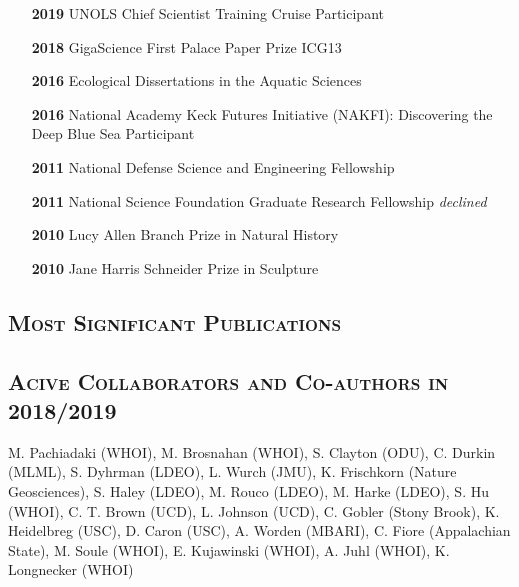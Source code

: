 \documentclass[svgnames,11pt]{article}
\begin{document}
\begin{itemize}[label={9999:},leftmargin=*,itemsep=0pt]
\item[\textbf{2019}] UNOLS Chief Scientist Training Cruise Participant
\item[\textbf{2018}] GigaScience First Palace Paper Prize ICG13
\item[\textbf{2016}] Ecological Dissertations in the Aquatic Sciences
\item[\textbf{2016}] National Academy Keck Futures Initiative (NAKFI): Discovering the Deep Blue Sea Participant
\item[\textbf{2011}] National Defense Science and Engineering Fellowship
\item[\textbf{2011}] National Science Foundation Graduate Research Fellowship \textit{declined}
\item[\textbf{2010}] Lucy Allen Branch Prize in Natural History
\item[\textbf{2010}] Jane Harris Schneider Prize in Sculpture
\end{itemize}

\subsection*{\textsc{Most Significant Publications}}
\vspace*{-0.75cm}

\subsection*{\textsc{Acive Collaborators and Co-authors in 2018/2019}}
M. Pachiadaki (WHOI), M. Brosnahan (WHOI), S. Clayton (ODU), C. Durkin (MLML), S. Dyhrman (LDEO), L. Wurch (JMU), K. Frischkorn (Nature Geosciences), S. Haley (LDEO), M. Rouco (LDEO), M. Harke (LDEO), S. Hu (WHOI), C. T. Brown (UCD), L. Johnson (UCD), C. Gobler (Stony Brook), K. Heidelbreg (USC), D. Caron (USC), A. Worden (MBARI), C. Fiore (Appalachian State), M. Soule (WHOI), E. Kujawinski (WHOI), A. Juhl (WHOI), K. Longnecker (WHOI)
\end{document}
